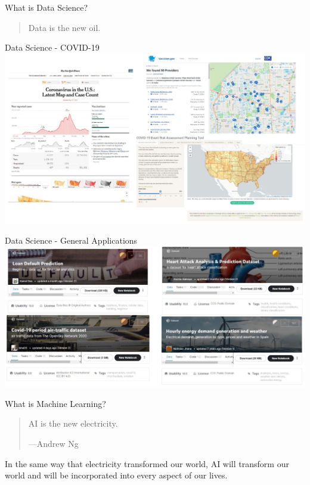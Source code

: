 \documentclass[]{beamer}
\begin{document}
\begin{frame}{What is Data Science?}
    \begin{quote}
        Data is the new oil.
    \end{quote}
\end{frame}

\begin{frame}{Data Science - COVID-19}
    \includegraphics[width=\textwidth]{imgs/vis_4.jpg}
\end{frame}

\begin{frame}{Data Science - General Applications}
    \includegraphics[width=\textwidth]{imgs/vis_5.jpg}
\end{frame}

\begin{frame}{What is Machine Learning?}
    \begin{quote}
        AI is the new electricity.
        \begin{flushleft}
            ---Andrew Ng
        \end{flushleft}
    \end{quote}

    \vspace{\baselineskip}

    In the same way that electricity transformed our world, AI will transform our world and will be incorporated into every aspect of our lives.
    
\end{frame}
\end{document}
